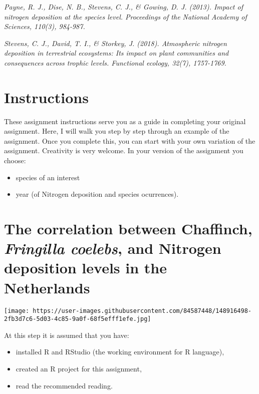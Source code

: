 \documentclass[
]{article}
\providecommand{\tightlist}{%
  \setlength{\itemsep}{0pt}\setlength{\parskip}{0pt}}
\begin{document}
\emph{Payne, R. J., Dise, N. B., Stevens, C. J., \& Gowing, D. J.
(2013). Impact of nitrogen deposition at the species level. Proceedings
of the National Academy of Sciences, 110(3), 984-987.}

\emph{Stevens, C. J., David, T. I., \& Storkey, J. (2018). Atmospheric
nitrogen deposition in terrestrial ecosystems: Its impact on plant
communities and consequences across trophic levels. Functional ecology,
32(7), 1757-1769.}

\hfill\break

\hypertarget{instructions}{%
\section{Instructions}\label{instructions}}

These assignment instructions serve you as a guide in completing your
original assignment. Here, I will walk you step by step through an
example of the assignment. Once you complete this, you can start with
your own variation of the assignment. Creativity is very welcome. In
your version of the assignment you choose:

\begin{itemize}
\tightlist
\item
  species of an interest
\item
  year (of Nitrogen deposition and species ocurrences).
\end{itemize}

\hypertarget{the-correlation-between-chaffinch-fringilla-coelebs-and-nitrogen-deposition-levels-in-the-netherlands}{%
\section*{\texorpdfstring{\textbf{The correlation between Chaffinch,
\emph{Fringilla coelebs}, and Nitrogen deposition levels in the
Netherlands}}{The correlation between Chaffinch, Fringilla coelebs, and Nitrogen deposition levels in the Netherlands}}\label{the-correlation-between-chaffinch-fringilla-coelebs-and-nitrogen-deposition-levels-in-the-netherlands}}

\texttt{[image: https://user-images.githubusercontent.com/84587448/148916498-2fb3d7c6-5d03-4c85-9a0f-68f5efff1efe.jpg]}

\hfill\break

At this step it is assumed that you have:

\begin{itemize}
\tightlist
\item
  installed R and RStudio (the working environment for R language),
\item
  created an R project for this assignment,
\item
  read the recommended reading.
\end{itemize}
\end{document}

